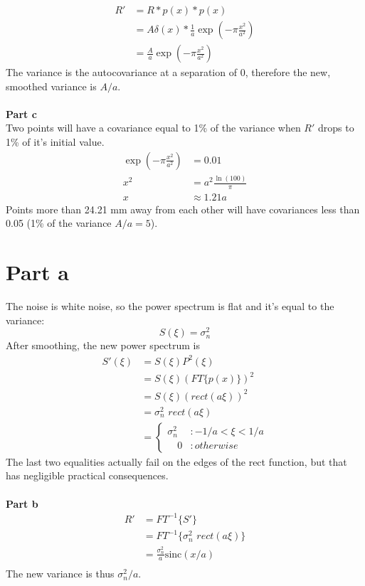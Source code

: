 \documentclass[11pt, oneside]{article}   	%
\begin{document}
\begin{align*}
R' &= R * p(x) * p(x) \\
&= A \delta(x) * \frac{1}{a} \exp(-\pi \frac{x^2}{a^2}) \\
&= \frac{A}{a} \exp(-\pi \frac{x^2}{a^2})
\end{align*}
The variance is the autocovariance at a separation of 0, therefore the new, smoothed variance is $A/a.$ \\ \\
%
\noindent \textbf{Part c} \\
Two points will have a covariance equal to 1\% of the variance when $R'$ drops to 1\% of it's initial value.
\begin{align*}
\exp(-\pi \frac{x^2}{a^2}) &= 0.01 \\
x^2 &= a^2 \frac{\ln (100)}{\pi} \\
x &\approx 1.21a
\end{align*}
Points more than 24.21 mm away from each other will have covariances less than 0.05 (1\% of the variance $A/a = 5$).
%
\newpage
\section{Part a} %
The noise is white noise, so the power spectrum is flat and it's equal to the variance:
\[S(\xi) = \sigma_n^2 \]
After smoothing, the new power spectrum is 
\begin{align*}
S'(\xi) &= S(\xi) P^2(\xi)  \\
&= S(\xi) \left(FT\{p(x)\}\right)^2 \\
&= S(\xi) \left(rect(a\xi)\right) ^2 \\
&= \sigma_n^2 \, \, rect(a\xi) \\
&= \left\{ 
\begin{array}{lr} 
\sigma_n^2 &: -1/a < \xi < 1/a \\ 
\quad 0 &: otherwise 
\end{array} 
\right.
\end{align*}
The last two equalities actually fail on the edges of the rect function, but that has negligible practical consequences. \\ \\
%
\noindent \textbf{Part b} \\
\begin{align*}
R' &= FT^{-1}\{S' \} \\
&= FT^{-1}\{\sigma_n^2 \, \, rect(a\xi) \} \\
&= \frac{\sigma_n^2}{a} \text{sinc}(x/a) \\
\end{align*}
The new variance is thus $\sigma_n^2/a$.
\end{document}
